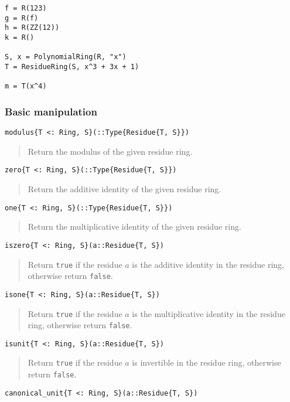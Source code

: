 \documentclass[a4paper,10pt]{article}
\newcommand{\code}{\lstinline}
\newcommand{\desc}[1]{\vspace{-3mm}\begin{quote}#1\end{quote}}
\begin{document}
{{{\begin{lstlisting}
f = R(123)
g = R(f)
h = R(ZZ(12))
k = R()

S, x = PolynomialRing(R, "x")
T = ResidueRing(S, x^3 + 3x + 1)

m = T(x^4)
\end{lstlisting}

\subsubsection{Basic manipulation}

\begin{lstlisting}
modulus{T <: Ring, S}(::Type{Residue{T, S}})
\end{lstlisting}

\desc{Return the modulus of the given residue ring.}

\begin{lstlisting}
zero{T <: Ring, S}(::Type{Residue{T, S}})
\end{lstlisting}

\desc{Return the additive identity of the given residue ring.}

\begin{lstlisting}
one{T <: Ring, S}(::Type{Residue{T, S}})
\end{lstlisting}

\desc{Return the multiplicative identity of the given residue ring.}

\begin{lstlisting}
iszero{T <: Ring, S}(a::Residue{T, S})
\end{lstlisting}

\desc{Return \code{true} if the residue $a$ is the additive identity in the
residue ring, otherwise return \code{false}.}

\begin{lstlisting}
isone{T <: Ring, S}(a::Residue{T, S})
\end{lstlisting}

\desc{Return \code{true} if the residue $a$ is the multiplicative identity in
the residue ring, otherwise return \code{false}.}

\begin{lstlisting}
isunit{T <: Ring, S}(a::Residue{T, S})
\end{lstlisting}

\desc{Return \code{true} if the residue $a$ is invertible in the residue ring,
otherwise return \code{false}.}

\begin{lstlisting}
canonical_unit{T <: Ring, S}(a::Residue{T, S})
\end{lstlisting}

}}}
\end{document}
